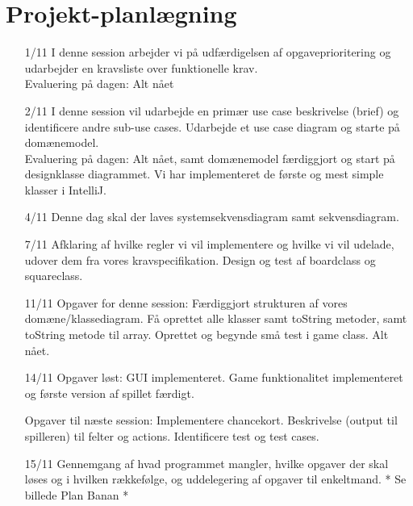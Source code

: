 \documentclass{article}
\begin{document}
\section{Projekt-planlægning}
\begin{itemize}
    \item [1/11] I denne session arbejder vi på udfærdigelsen af opgaveprioritering og udarbejder en kravsliste over funktionelle krav.\\
    Evaluering på dagen: Alt nået
    \item [2/11] I denne session vil udarbejde en primær use case beskrivelse (brief) og identificere andre sub-use cases. Udarbejde et use case diagram og starte på domænemodel.\\
    Evaluering på dagen: Alt nået, samt domænemodel færdiggjort og start på designklasse diagrammet. Vi har implementeret de første og mest simple klasser i IntelliJ.
    \item [4/11] Denne dag skal der laves systemsekvensdiagram samt sekvensdiagram.
    \item [7/11]
    Afklaring af hvilke regler vi vil implementere og hvilke vi vil udelade, udover dem fra vores kravspecifikation. Design og test af boardclass og squareclass.
    \item [11/11]
    Opgaver for denne session:
    Færdiggjort strukturen af vores domæne/klassediagram. Få oprettet alle klasser samt toString metoder, samt toString metode til array. Oprettet og begynde små test i game class. Alt nået.
    
    \item [14/11]
    Opgaver løst: GUI implementeret. Game funktionalitet implementeret og  første version af spillet færdigt. 
    
    Opgaver til næste session: Implementere chancekort. Beskrivelse (output til spilleren) til felter og actions. Identificere test og test cases.
    
    \item[15/11]
            Gennemgang af hvad programmet mangler, hvilke opgaver der skal løses og i hvilken rækkefølge,  og uddelegering af opgaver til enkeltmand. * Se billede Plan Banan * 


\end{itemize}
\end{document}
